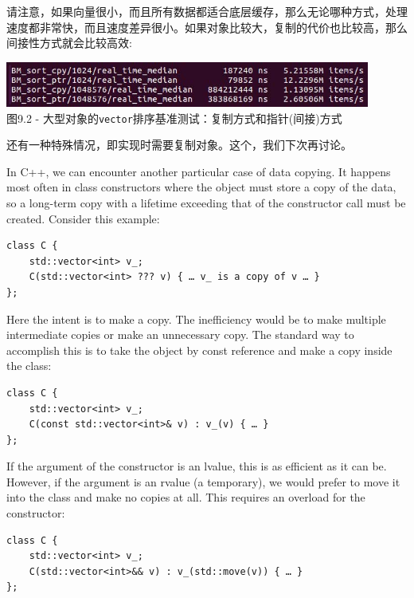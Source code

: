 请注意，如果向量很小，而且所有数据都适合底层缓存，那么无论哪种方式，处理速度都非常快，而且速度差异很小。如果对象比较大，复制的代价也比较高，那么间接性方式就会比较高效:

\begin{center}
\includegraphics[width=0.9\textwidth]{content/3/chapter9/images/2.jpg}\\
图9.2 - 大型对象的\texttt{vector}排序基准测试：复制方式和指针(间接)方式
\end{center}

还有一种特殊情况，即实现时需要复制对象。这个，我们下次再讨论。


In C++, we can encounter another particular case of data copying. It happens most often in class constructors where the object must store a copy of the data, so a long-term copy with a lifetime exceeding that of the constructor call must be created. Consider this example:

\begin{lstlisting}[style=styleCXX]
class C {
	std::vector<int> v_;
	C(std::vector<int> ??? v) { … v_ is a copy of v … }
};
\end{lstlisting}

Here the intent is to make a copy. The inefficiency would be to make multiple intermediate copies or make an unnecessary copy. The standard way to accomplish this is to take the object by const reference and make a copy inside the class:

\begin{lstlisting}[style=styleCXX]
class C {
	std::vector<int> v_;
	C(const std::vector<int>& v) : v_(v) { … }
};
\end{lstlisting}

If the argument of the constructor is an lvalue, this is as efficient as it can be. However, if the argument is an rvalue (a temporary), we would prefer to move it into the class and make no copies at all. This requires an overload for the constructor:

\begin{lstlisting}[style=styleCXX]
class C {
	std::vector<int> v_;
	C(std::vector<int>&& v) : v_(std::move(v)) { … }
};
\end{lstlisting}

